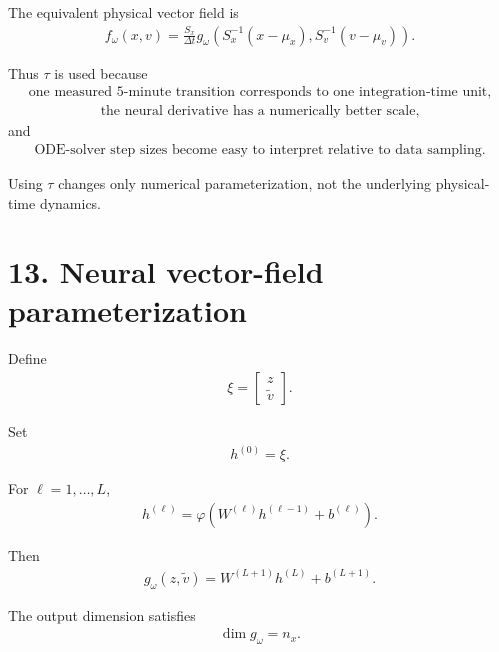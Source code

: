 \documentclass[11pt]{article}
\begin{document}
The equivalent physical vector field is
\begin{align}
\boxed{
f_\omega(x,v)
=
\frac{S_x}{\Delta t}
g_\omega
\left(
S_x^{-1}(x-\mu_x),
S_v^{-1}(v-\mu_v)
\right).
}
\tag{N3.33}
\end{align}

Thus \(\tau\) is used because
\begin{align}
\boxed{
\text{one measured 5-minute transition corresponds to one integration-time unit,}
}
\tag{N3.34}
\end{align}
\begin{align}
\boxed{
\text{the neural derivative has a numerically better scale,}
}
\tag{N3.35}
\end{align}
and
\begin{align}
\boxed{
\text{ODE-solver step sizes become easy to interpret relative to data sampling.}
}
\tag{N3.36}
\end{align}

Using \(\tau\) changes only numerical parameterization, not the underlying physical-time dynamics.

\section*{13. Neural vector-field parameterization}

Define
\begin{align}
\xi=
\begin{bmatrix}
z\\
\widetilde v
\end{bmatrix}.
\end{align}

Set
\begin{align}
\boxed{h^{(0)}=\xi.}
\tag{N3.37}
\end{align}

For \(\ell=1,\ldots,L\),
\begin{align}
\boxed{
h^{(\ell)}
=
\varphi
\left(
W^{(\ell)}h^{(\ell-1)}+b^{(\ell)}
\right).
}
\tag{N3.38}
\end{align}

Then
\begin{align}
\boxed{
g_\omega(z,\widetilde v)
=
W^{(L+1)}h^{(L)}+b^{(L+1)}.
}
\tag{N3.39}
\end{align}

The output dimension satisfies
\begin{align}
\boxed{\dim g_\omega=n_x.}
\tag{N3.40}
\end{align}
\end{document}
